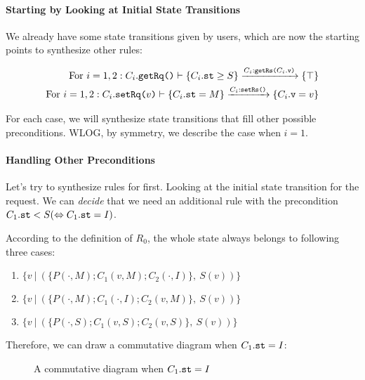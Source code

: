 \documentclass[format=manuscript]{acmart}
\begin{document}
\paragraph{Starting by Looking at Initial State Transitions}

We already have some state transitions given by users, which are now the
starting points to synthesize other rules:

\begin{eqnarray*}
  \textrm{For}\ i=1,2: C_i.\texttt{getRq()}\vdash \{ C_i.\texttt{st} \geq S \} \xrightarrow{C_i:\texttt{getRs(}C_i.\texttt{v}\texttt{)}} \{ \top \} \\
  \textrm{For}\ i=1,2: C_i.\texttt{setRq(}v\texttt{)}\vdash \{ C_i.\texttt{st} = M \} \xrightarrow{C_i:\texttt{setRs()}} \{ C_i.\texttt{v} = v \}
\end{eqnarray*}

For each case, we will synthesize state transitions that fill other possible
preconditions. WLOG, by symmetry, we describe the case when $i = 1$.

\paragraph{Handling Other Preconditions}

Let's try to synthesize rules for  first. Looking at the initial
state transition for the request. We can \emph{decide} that we need an
additional rule with the precondition $C_1.\texttt{st} < S (\Leftrightarrow
C_1.\texttt{st} = I)$.

According to the definition of $R_0$, the whole state always belongs to
following three cases:

\begin{enumerate}
\item $\{ v\ |\ (\{ P(\cdot, M); C_1(v, M); C_2(\cdot, I) \},\ S(v)) \}$
\item $\{ v\ |\ (\{ P(\cdot, M); C_1(\cdot, I); C_2(v, M) \},\ S(v)) \}$
\item $\{ v\ |\ (\{ P(\cdot, S); C_1(v, S); C_2(v, S) \},\ S(v)) \}$
\end{enumerate}

Therefore, we can draw a commutative diagram when $C_1.\texttt{st} = I$:

\begin{figure}[h]
  \caption{A commutative diagram when $C_1.\texttt{st} = I$}
  \label{fig:comm-diagram-status-i}
\end{figure}
\end{document}
